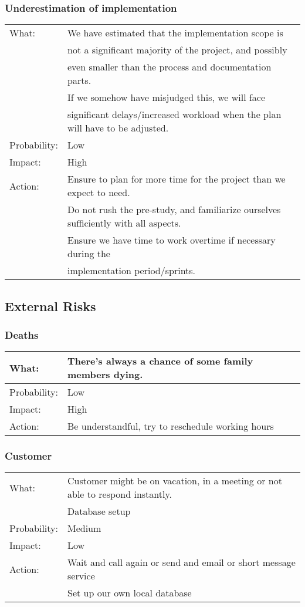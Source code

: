 \subsubsection{Underestimation of implementation}
\begin{tabular}{| l | l |}
	\hline
	What: & We have estimated that the implementation scope is \\
	&not a significant majority of the project, and possibly \\
	&even smaller than the process and documentation parts. \\
	& If we somehow have misjudged this, we will face \\
	& significant delays/increased workload when the plan will have to be adjusted.\\
	\hline
	Probability: & Low \\
	\hline
	Impact: & High \\
	\hline
	Action: & Ensure to plan for more time for the project than we expect to need.\\
	& Do not rush the pre-study, and familiarize ourselves sufficiently with all aspects.\\
	& Ensure we have time to work overtime if necessary during the\\
	& implementation period/sprints.\\
	\hline
\end{tabular}

\subsection{External Risks}
\subsubsection{Deaths}
\begin{tabular}{| l | l |}
	\hline
	What: & There's always a chance of some family members dying.\\
	\hline
	Probability: & Low \\
	\hline
	Impact: & High \\
	\hline
	Action: & Be understandful, try to reschedule working hours\\
	\hline
\end{tabular}

\subsubsection{Customer}
\begin{tabular}{| l | l |}
	\hline
	What: & Customer might be on vacation, in a meeting or not able to respond instantly.\\
	& Database setup\\
	\hline
	Probability: & Medium \\
	\hline
	Impact: & Low \\
	\hline
	Action: & Wait and call again or send and email or short message service\\
	& Set up our own local database\\
	\hline
\end{tabular}

